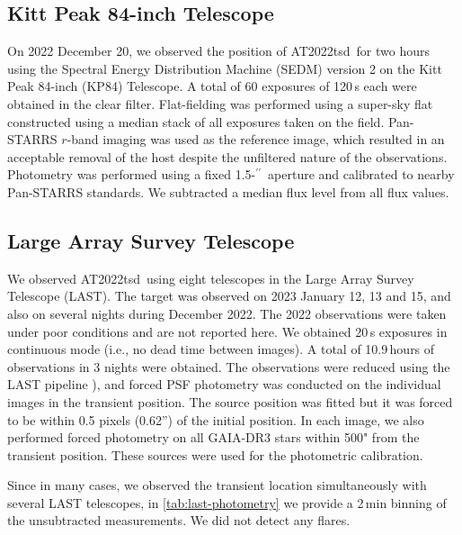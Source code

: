 \documentclass{nature_plusfigure}
\newcommand{\at}{AT2022tsd}
\newcommand{\ayqh}[1]{{\textcolor{red}{\texttt{AYQH: #1}}}}
\newcommand{\arcsec}{$^{\prime\prime}$}
\begin{document}
\begin{methods}
\subsection{Kitt Peak 84-inch Telescope}
\label{sec:kp84}

On 2022 December 20, we observed the position of \at\ for two hours using the Spectral Energy Distribution Machine (SEDM\cite{Blagorodnova2018}) version 2 on the Kitt Peak 84-inch (KP84) Telescope. A total of 60 exposures of 120\,s each were obtained in the clear filter. Flat-fielding was performed using a super-sky flat constructed using a median stack of all exposures taken on the field.  Pan-STARRS $r$-band imaging was used as the reference image, which resulted in an acceptable removal of the host despite the unfiltered nature of the observations.  Photometry was performed using a fixed 1.5-\arcsec\ aperture and calibrated to nearby Pan-STARRS standards. We subtracted a median flux level from all flux values.

\subsection{Large Array Survey Telescope}
\label{sec:last}

We observed \at\ using eight telescopes in the Large Array Survey Telescope (LAST\cite{Ofek2023,BenAmi2023}).
The target was observed on 2023 January 12, 13 and 15, and also on several nights during December 2022.
The 2022 observations were taken under poor conditions and are not reported here.
We obtained 20\,s exposures in continuous mode (i.e., no dead time between images).
A total of 10.9\,hours of observations in 3 nights were obtained.
The observations were reduced using the LAST pipeline \cite{Ofek2014,Ofek2019,Ofek2023}), and forced PSF photometry was conducted on the individual images
in the transient position. 
The source position was fitted but it was forced to be within 0.5 pixels (0.62'') of the initial position.
In each image, we also performed forced photometry on all GAIA-DR3\cite{Gaia2021} stars
within 500" from the transient position.
These sources were used for the photometric calibration.

Since in many cases, we observed the transient location simultaneously with several LAST telescopes, in \ref{tab:last-photometry} we provide a 2\,min binning of the unsubtracted measurements. We did not detect any flares.



\end{methods}
\end{document}
